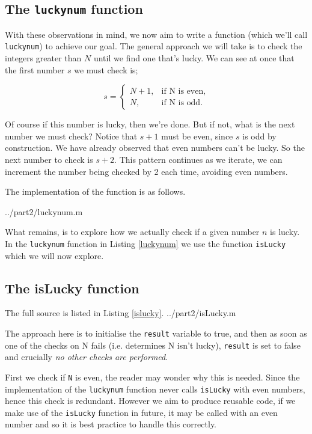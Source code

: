\documentclass[10pt]{article}
\begin{document}
\subsection{The \texttt{luckynum} function}

With these observations in mind, we now aim to write a function (which we'll call \texttt{luckynum}) to achieve our goal. The general approach  we will take is to check the integers greater than $N$ until we find one that's lucky. We can see at once that the first number $s$ we must check is;

$$ s = \begin{cases}
               N + 1,& \text{if N is even,}\\
               N, & \text{if N is odd.}
            \end{cases}
$$

Of course if this number is lucky, then we're done. But if not, what is the next number we must check? Notice that $s + 1$ must be even, since $s$ is odd by construction. We have already observed that even numbers can't be lucky. So the next number to check is $s+2$. This pattern continues as we iterate, we can increment the number being checked by 2 each time, avoiding even numbers.

The implementation of the function is as follows. 

   {../part2/luckynum.m}

What remains, is to explore how we actually check if a given number $n$ is lucky. In the \texttt{luckynum} function in Listing \ref{luckynum} we use the function \texttt{isLucky} which we will now explore.

  
\subsection{The isLucky function}

The full source is listed in Listing \ref{islucky}.
   {../part2/isLucky.m}
  
The approach here is to initialise the \texttt{result} variable to true, and then as soon as one of the checks on N fails (i.e. determines N isn't lucky),  \texttt{result} is set to false and crucially \emph{no other checks are performed}. 

First we check if \texttt{N} is even, the reader may wonder why this is needed. Since the implementation of the \texttt{luckynum} function never calls \texttt{isLucky} with even numbers, hence this check is redundant. However we aim to produce reusable code, if we make use of the \texttt{isLucky} function in future, it may be called with an even number and so it is best practice to handle this correctly.
\end{document}
